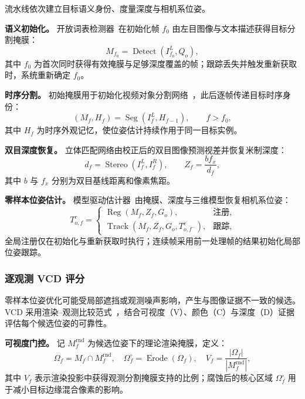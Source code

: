 \documentclass[review]{vgtc}
\begin{document}
流水线依次建立目标语义身份、度量深度与相机系位姿。

\textbf{语义初始化。}
开放词表检测器~\cite{yoloe2025}在初始化帧 $f_0$ 由左目图像与文本描述获得目标分割掩膜：
\begin{equation}
M_{f_0} = \operatorname{Detect}(I_{f_0}^{L}, Q_o),
\label{eq:detect}
\end{equation}
其中 $f_0$ 为首次同时获得有效掩膜与足够深度覆盖的帧；跟踪丢失并触发重新获取时，系统重新确定 $f_0$。

\textbf{时序分割。}
初始掩膜用于初始化视频对象分割网络~\cite{cutie2024}，此后逐帧传递目标时序身份：
\begin{equation}
(M_f, H_f) = \operatorname{Seg}(I_f^{L}, H_{f-1}), \qquad f > f_0,
\label{eq:seg}
\end{equation}
其中 $H_f$ 为时序外观记忆，使位姿估计持续作用于同一目标实例。

\textbf{双目深度恢复。}
立体匹配网络由校正后的双目图像预测视差并恢复米制深度：
\begin{equation}
d_f = \operatorname{Stereo}(I_f^{L}, I_f^{R}), \qquad Z_f = \frac{b f_x}{d_f},
\label{eq:depth}
\end{equation}
其中 $b$ 与 $f_x$ 分别为双目基线距离和像素焦距。

\textbf{零样本位姿估计。}
模型驱动估计器~\cite{foundationpose2024}由掩膜、深度与三维模型恢复相机系位姿：
\begin{equation}
T_{o,f}^{c} =
\begin{cases}
\operatorname{Reg}(M_f, Z_f, G_o), & \text{注册}, \\
\operatorname{Track}(M_f, Z_f, G_o, T_{o,f^-}^{c}), & \text{跟踪},
\end{cases}
\label{eq:pose}
\end{equation}
全局注册仅在初始化与重新获取时执行；连续帧采用前一处理帧的结果初始化局部位姿跟踪。

\subsubsection{逐观测 VCD 评分}

零样本位姿优化可能受局部遮挡或观测噪声影响，产生与图像证据不一致的候选。VCD 采用渲染--观测比较范式~\cite{deepim2018,latentfusion2020,focalpose2022}，结合可视度（V）、颜色（C）与深度（D）证据评估每个候选位姿的可靠性。

\textbf{可视度门控。}
记 $M_f^{\mathrm{rnd}}$ 为候选位姿下的理论渲染掩膜，定义：
\begin{equation}
\Omega_f = M_f \cap M_f^{\mathrm{rnd}}, \quad \Omega_f^{\circ} = \operatorname{Erode}(\Omega_f), \quad V_f = \frac{|\Omega_f|}{|M_f^{\mathrm{rnd}}|},
\label{eq:visibility}
\end{equation}
其中 $V_f$ 表示渲染投影中获得观测分割掩膜支持的比例；腐蚀后的核心区域 $\Omega_f^\circ$ 用于减小目标边缘混合像素的影响。
\end{document}
